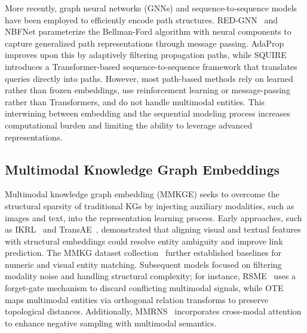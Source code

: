 \documentclass[runningheads]{llncs}
\begin{document}
More recently, graph neural networks (GNNs) and sequence-to-sequence models have been employed to efficiently encode path structures. RED-GNN~\cite{zhang2022knowledge} and NBFNet \cite{zhu2021neural} parameterize the Bellman-Ford algorithm with neural components to capture generalized path representations through message passing. AdaProp~\cite{zhang2023adaprop} improves upon this by adaptively filtering propagation paths, while SQUIRE~\cite{bai2022squire} introduces a Transformer-based sequence-to-sequence framework that translates queries directly into paths. However, most path-based methods rely on learned rather than frozen embeddings, use reinforcement learning or message-passing rather than Transformers, and do not handle multimodal entities. This interwining between embedding and the sequential modeling process increases computational burden and limiting the ability to leverage advanced representations.

\subsection{Multimodal Knowledge Graph Embeddings}
\label{sec:rw-mmkge}

Multimodal knowledge graph embedding (MMKGE) seeks to overcome the structural sparsity of traditional KGs by injecting auxiliary modalities, such as images and text, into the representation learning process. Early approaches, such as IKRL~\cite{xie2017image} and TransAE~\cite{wang2019transae}, demonstrated that aligning visual and textual features with structural embeddings could resolve entity ambiguity and improve link prediction. The MMKG dataset collection~\cite{liu2019mmkg} further established baselines for numeric and visual entity matching. Subsequent models focused on filtering modality noise and handling structural complexity; for instance, RSME~\cite{wang2021rsme} uses a forget-gate mechanism to discard conflicting multimodal signals, while OTE~\cite{tang2020orthogonal} maps multimodal entities via orthogonal relation transforms to preserve topological distances. Additionally, MMRNS~\cite{xu2022multimodal} incorporates cross-modal attention to enhance negative sampling with multimodal semantics.
\end{document}
